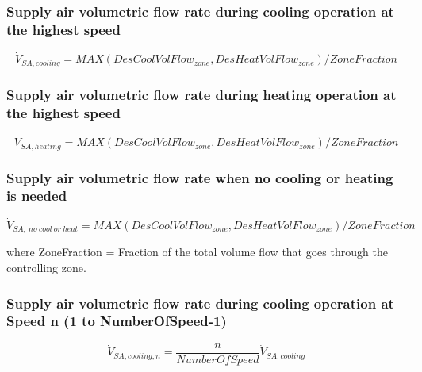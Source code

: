 \subsubsection{Supply air volumetric flow rate during cooling operation at the highest speed}\label{supply-air-volumetric-flow-rate-during-cooling-operation-at-the-highest-speed}

\begin{equation}
\dot V_{SA,cooling} = MAX(DesCoolVolFlow_{zone},DesHeatVolFlow_{zone})/ZoneFraction
\end{equation}

\subsubsection{Supply air volumetric flow rate during heating operation at the highest speed}\label{supply-air-volumetric-flow-rate-during-heating-operation-at-the-highest-speed}

\begin{equation}
\dot V_{SA,heating} = MAX(DesCoolVolFlow_{zone},DesHeatVolFlow_{zone})/ZoneFraction
\end{equation}

\subsubsection{Supply air volumetric flow rate when no cooling or heating is needed}\label{supply-air-volumetric-flow-rate-when-no-cooling-or-heating-is-needed-1}

\begin{equation}
\dot V_{SA,~no~cool~or~heat} = MAX(DesCoolVolFlow_{zone},DesHeatVolFlow_{zone})/ZoneFraction
\end{equation}

where ZoneFraction = Fraction of the total volume flow that goes through the controlling zone.

\subsubsection{Supply air volumetric flow rate during cooling operation at Speed n (1 to NumberOfSpeed-1)}\label{supply-air-volumetric-flow-rate-during-cooling-operation-at-speed-n-1-to-numberofspeed-1}

\begin{equation}
\dot V_{SA,cooling,n} = \frac{n}{NumberOfSpeed}{\dot V_{SA,cooling}}
\end{equation}

